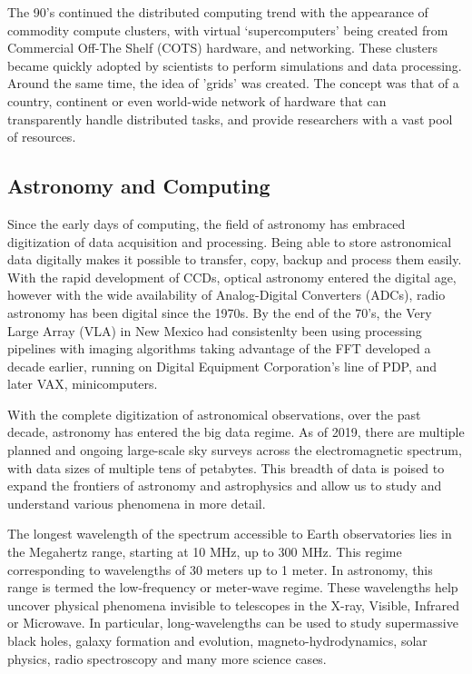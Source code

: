 The 90's continued the distributed computing trend with the appearance of commodity compute clusters, with virtual `supercomputers' being created from Commercial Off-The Shelf (COTS) hardware, and networking. These clusters became quickly adopted by scientists to perform simulations and data processing. Around the same time, the idea of 'grids' was created. The concept was that of a country, continent or even world-wide network of hardware that can transparently handle distributed tasks, and provide researchers with a vast pool of resources.


\subsection{Astronomy and Computing}

Since the early days of computing, the field of astronomy has embraced digitization of data acquisition and processing. Being able to store astronomical data digitally makes it possible to transfer, copy, backup and process them easily. With the rapid development of CCDs, optical astronomy entered the digital age, however with the wide availability of Analog-Digital Converters (ADCs), radio astronomy has been digital since the 1970s. By the end of the 70's, the Very Large Array (VLA) in New Mexico had consistenlty been using processing pipelines with imaging algorithms taking advantage of the FFT developed a decade earlier\citep{clark1980_clean}, running on Digital Equipment Corporation's line of PDP, and later VAX, minicomputers. 

With the complete digitization of astronomical observations, over the past decade, astronomy has entered the big data regime. As of 2019, there are multiple planned and ongoing large-scale sky surveys across the electromagnetic spectrum, with data sizes of multiple tens of petabytes. This breadth of data is poised to expand the frontiers of astronomy and astrophysics and allow us to study and understand various phenomena in more detail.

The longest wavelength of the spectrum accessible to Earth observatories lies in the Megahertz range, starting at 10 MHz, up to 300 MHz. This regime corresponding to wavelengths of 30 meters up to 1 meter. In astronomy, this range is termed the low-frequency or meter-wave regime. These wavelengths help uncover physical phenomena invisible to telescopes in the X-ray, Visible, Infrared or Microwave. In particular, long-wavelengths can be used to study supermassive black holes, galaxy formation and evolution, magneto-hydrodynamics, solar physics, radio spectroscopy and many more science cases.

